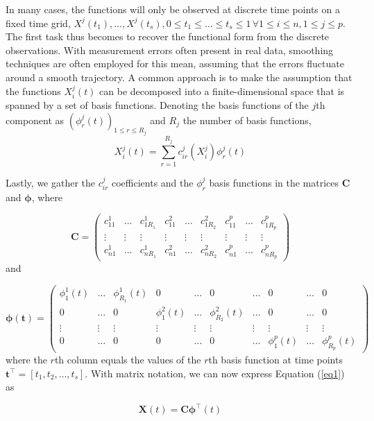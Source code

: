 \documentclass[12pt,a4paper]{article}
\begin{document}
In many cases, the functions will only be observed at discrete time points on a fixed time grid, 
$
X^j(t_1), \ldots, X^j(t_s), 0 \leq t_1 \leq \ldots \leq t_s \leq 1 \, \forall 1 \leq i \leq n, 1 \leq j \leq p.
$
The first task thus becomes to recover the functional form from the discrete observations. With measurement errors often present in real data, smoothing techniques are often employed for this mean, assuming that the errors fluctuate around a smooth trajectory. A common approach is to make the assumption that the functions  
$
X_i^j(t) 
$
can be decomposed into a finite-dimensional space that is spanned by a set of basis functions. Denoting the basis functions of the $j$th component as 
$
(\phi_r^j(t))_{1\leq r \leq R_j}
$
and $R_j$ the number of basis functions, 
%
\begin{equation}\label{eq1}
X_i^j(t) = \sum_{r=1}^{R_j} c_{ir}^j(X_i^j) \phi_r^j(t)	
\end{equation}
%

Lastly, we gather the $c_{ir}^j$ coefficients and the $\phi_r^j$ basis functions in the matrices $\mathbf{C}$ and $\boldsymbol{\phi}$, where 

$$
\mathbf{C} = \begin{pmatrix}
	c_{11}^1 & \ldots & c_{1R_1}^1 & c_{11}^2 & \ldots & c_{1R_2}^2 & c_{11}^p & \ldots & c_{1R_p}^p \\
	\vdots & \vdots & \vdots & \vdots & \vdots & \vdots & \vdots & \vdots & \vdots \\ 
	c_{n1}^1 & \ldots & c_{nR_1}^1 & c_{n1}^2 & \ldots & c_{nR_2}^2 & c_{n1}^p & \ldots & c_{nR_p}^p
\end{pmatrix}
$$
and 

$$
\boldsymbol{\phi}(\mathbf{t}) = \begin{pmatrix}
	\phi_1^1(t) & \ldots & \phi_{R_1}^1(t) & 0 & \ldots & 0 & \ldots & 0 & \ldots & 0 \\
	0 & \ldots & 0 & \phi_1^2(t) & \ldots & \phi_{R_2}^2(t) & \ldots & 0 & \ldots & 0 \\ 
	\vdots & \vdots & \vdots & \vdots & \vdots & \vdots & \vdots & \vdots & \vdots & \vdots \\ 
	0 & \ldots & 0 & 0 & \ldots & 0 & \ldots & \phi_1^p(t) & \ldots & \phi_{R_p}^p(t)
\end{pmatrix}
$$
where the $r$th column equals the values of the $r$th basis function at time points $\mathbf{t}^\top = [t_1, t_2, \ldots, t_s]$.
With matrix notation, we can now express Equation (\ref{eq1}) as 

$$
\mathbf{X}(t) = \mathbf{C} \boldsymbol{\phi}^\top(t)
$$
\end{document}

